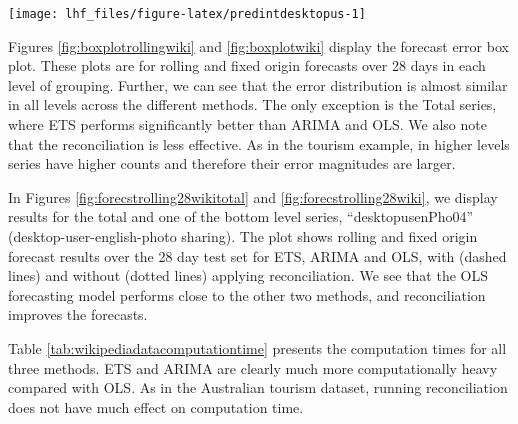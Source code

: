 \documentclass[11pt,a4paper,]{article}
\let\origfigure\figure
\let\endorigfigure\endfigure
\renewenvironment{figure}[1][2] {
    \expandafter\origfigure\expandafter[!htbp]
} {
    \endorigfigure
}
\begin{document}
\begin{figure}

{\centering \texttt{[image: lhf\_files/figure-latex/predintdesktopus-1]} 

}

\caption{The actual test set for the 'BACBus' bottom level series compared to the forecasts from reconciled and unreconciled OLS methods with prediction interval for rolling and fixed origin  Wikipedia pageviews.}\label{fig:predintdesktopus}
\end{figure}

Figures \ref{fig:boxplotrollingwiki} and \ref{fig:boxplotwiki} display the forecast error box plot. These plots are for rolling and fixed origin forecasts over 28 days in each level of grouping. Further, we can see that the error distribution is almost similar in all levels across the different methods. The only exception is the Total series, where ETS performs significantly better than ARIMA and OLS. We also note that the reconciliation is less effective. As in the tourism example, in higher levels series have higher counts and therefore their error magnitudes are larger.

In Figures \ref{fig:forecstrolling28wikitotal} and \ref{fig:forecstrolling28wiki}, we display results for the total and one of the bottom level series, ``desktopusenPho04'' (desktop-user-english-photo sharing). The plot shows rolling and fixed origin forecast results over the 28 day test set for ETS, ARIMA and OLS, with (dashed lines) and without (dotted lines) applying reconciliation. We see that the OLS forecasting model performs close to the other two methods, and reconciliation improves the forecasts.

Table \ref{tab:wikipediadatacomputationtime} presents the computation times for all three methods. ETS and ARIMA are clearly much more computationally heavy compared with OLS. As in the Australian tourism dataset, running reconciliation does not have much effect on computation time.
\end{document}
